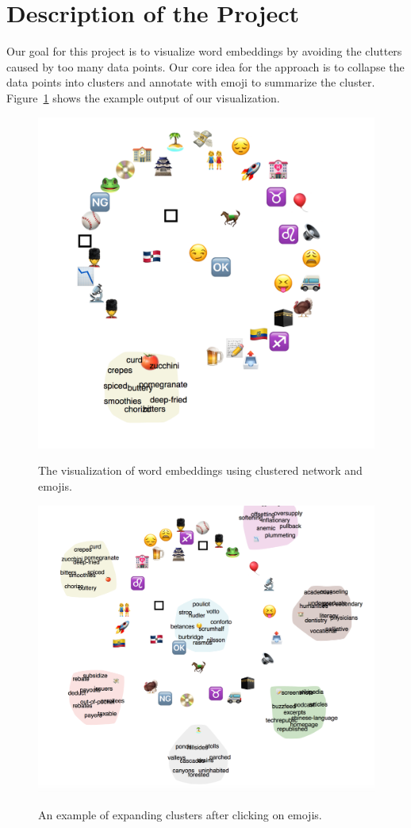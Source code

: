 \section{Description of the Project}
Our goal for this project is to visualize word embeddings by avoiding the clutters caused by too many data points. 
Our core idea for the approach is to collapse the data points into clusters and annotate with emoji to summarize the cluster.
Figure~\ref{fig:cluster_network} shows the example output of our visualization. 

\begin{figure}[htb]
 \centering
     {\includegraphics[width=0.68\linewidth]{figures/clustered_network.png}}
    \vspace{-1ex}
     \caption{The visualization of word embeddings using clustered network and emojis.}
\label{fig:cluster_network}
\end{figure}

\begin{figure}[htb]
 \centering
     {\includegraphics[width=0.68\linewidth]{figures/clustered_network_opened.png}}
    \vspace{-1ex}
     \caption{An example of expanding clusters after clicking on emojis.}
\label{fig:cluster_network_opened}
\end{figure}

